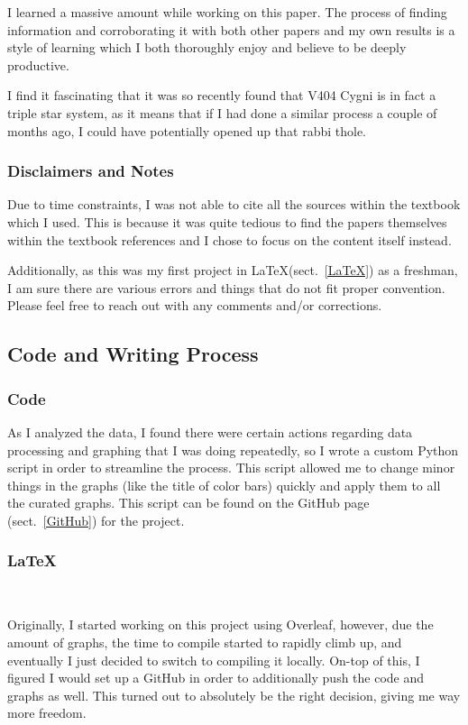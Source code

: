 \documentclass[12pt, a4paper]{article}
\begin{document}
    I learned a massive amount while working on this paper. The process of finding information and corroborating it with both other papers and my own results is a style of learning which I both thoroughly enjoy and believe to be deeply productive.

    I find it fascinating that it was so recently found that V404 Cygni is in fact a triple star system, as it means that if I had done a similar process a couple of months ago, I could have potentially opened up that rabbi thole. 

    \subsubsection{Disclaimers and Notes}
        Due to time constraints, I was not able to cite all the sources within the textbook \parencite{TaurisvandenHeuvel+2023} which I used. This is because it was quite tedious to find the papers themselves within the textbook references and I chose to focus on the content itself instead. 

        Additionally, as this was my first project in \LaTeX (sect.~\ref{LaTeX}) as a freshman, I am sure there are various errors and things that do not fit proper convention. Please feel free to reach out with any comments and/or corrections.

    \subsection{Code and Writing Process}
        \subsubsection{Code}

            As I analyzed the data, I found there were certain actions regarding data processing and graphing that I was doing repeatedly, so I wrote a custom Python script in order to streamline the process. This script allowed me to change minor things in the graphs (like the title of color bars) quickly and apply them to all the curated graphs. This script can be found on the GitHub page (sect.~\ref{GitHub}) for the project. 

        \subsubsection{\LaTeX}~\label{LaTeX}
        
            Originally, I started working on this project using Overleaf, however, due the amount of graphs, the time to compile started to rapidly climb up, and eventually I just decided to switch to compiling it locally. On-top of this, I figured I would set up a GitHub in order to additionally push the code and graphs as well. This turned out to absolutely be the right decision, giving me way more freedom.
\end{document}
